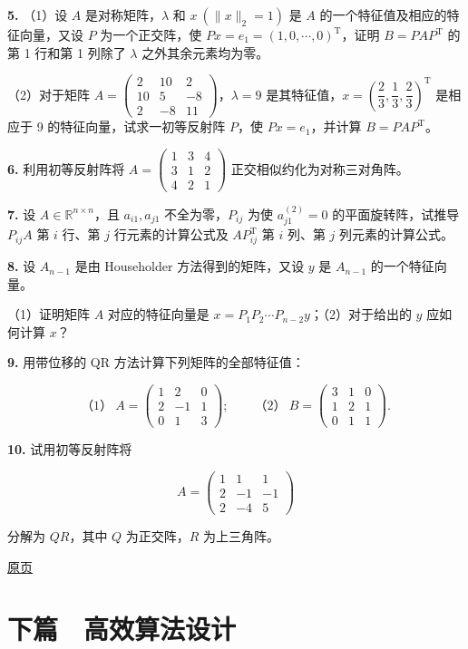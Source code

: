 \documentclass[
  10pt,
  fontset=fandol]{ctexart}
\begin{document}
\textbf{5.} （1）设 \(A\) 是对称矩阵，\(\lambda\) 和 \(x\ (\|x\|_2=1)\) 是 \(A\) 的一个特征值及相应的特征向量，又设 \(P\) 为一个正交阵，使 \(Px=e_1=(1,0,\cdots,0)^{\mathrm T}\)，证明 \(B=PAP^{\mathrm T}\) 的第 1 行和第 1 列除了 \(\lambda\) 之外其余元素均为零。

（2）对于矩阵 \(A=\begin{pmatrix}2&10&2\\10&5&-8\\2&-8&11\end{pmatrix}\)，\(\lambda=9\) 是其特征值，\(x=\left(\dfrac23,\dfrac13,\dfrac23\right)^{\mathrm T}\) 是相应于 9 的特征向量，试求一初等反射阵 \(P\)，使 \(Px=e_1\)，并计算 \(B=PAP^{\mathrm T}\)。

\textbf{6.} 利用初等反射阵将 \(A=\begin{pmatrix}1&3&4\\3&1&2\\4&2&1\end{pmatrix}\) 正交相似约化为对称三对角阵。

\textbf{7.} 设 \(A\in\mathbb R^{n\times n}\)，且 \(a_{i1},a_{j1}\) 不全为零，\(P_{ij}\) 为使 \(a_{j1}^{(2)}=0\) 的平面旋转阵，试推导 \(P_{ij}A\) 第 \(i\) 行、第 \(j\) 行元素的计算公式及 \(AP_{ij}^{\mathrm T}\) 第 \(i\) 列、第 \(j\) 列元素的计算公式。

\textbf{8.} 设 \(A_{n-1}\) 是由 Householder 方法得到的矩阵，又设 \(y\) 是 \(A_{n-1}\) 的一个特征向量。

（1）证明矩阵 \(A\) 对应的特征向量是 \(x=P_1P_2\cdots P_{n-2}y\)；（2）对于给出的 \(y\) 应如何计算 \(x\)？

\textbf{9.} 用带位移的 QR 方法计算下列矩阵的全部特征值：

\[
\text{（1）}\ A=\begin{pmatrix}1&2&0\\2&-1&1\\0&1&3\end{pmatrix};\qquad
\text{（2）}\ B=\begin{pmatrix}3&1&0\\1&2&1\\0&1&1\end{pmatrix}.
\]

\textbf{10.} 试用初等反射阵将

\[
A=\begin{pmatrix}1&1&1\\2&-1&-1\\2&-4&5\end{pmatrix}
\]

分解为 \(QR\)，其中 \(Q\) 为正交阵，\(R\) 为上三角阵。

\href{../../source-images/pdf-261.jpeg}{原页}

\section{下篇　高效算法设计}\label{ux4e0bux7bc7-ux9ad8ux6548ux7b97ux6cd5ux8bbeux8ba1}
\end{document}
